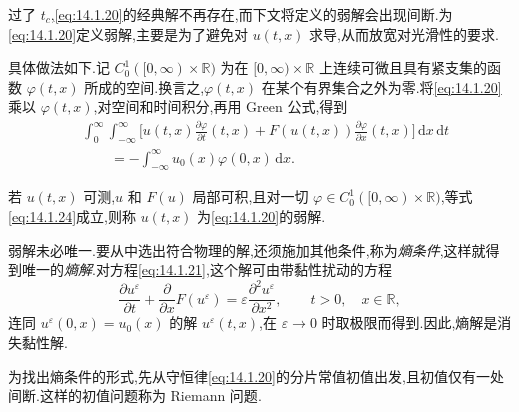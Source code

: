 过了 \(t_c\),\eqref{eq:14.1.20}的经典解不再存在,而下文将定义的弱解会出现间断.为\eqref{eq:14.1.20}定义弱解,主要是为了避免对 \(u(t,x)\) 求导,从而放宽对光滑性的要求.

具体做法如下.记 \(C_0^1([0,\infty)\times\mathbb R)\) 为在 \([0,\infty)\times\mathbb R\) 上连续可微且具有紧支集的函数 \(\varphi(t,x)\) 所成的空间.换言之,\(\varphi(t,x)\) 在某个有界集合之外为零.将\eqref{eq:14.1.20}乘以 \(\varphi(t,x)\),对空间和时间积分,再用 Green 公式,得到
\begin{equation}\label{eq:14.1.24}
  \begin{aligned}
    &\int_0^\infty\!\!\int_{-\infty}^\infty
         \biggl[u(t,x)\frac{\partial\varphi}{\partial t}(t,x)
                +F(u(t,x))\frac{\partial\varphi}{\partial x}(t,x)\biggr]
                   \,\mathrm dx\,\mathrm dt\\
    &\qquad=-\int_{-\infty}^{\infty}u_0(x)\varphi(0,x)\,\mathrm dx.
  \end{aligned}
\end{equation}

\begin{definition*}
若 \(u(t,x)\) 可测,\(u\) 和 \(F(u)\) 局部可积,且对一切 \(\varphi\in C_0^1([0,\infty)\times\mathbb R)\),等式\eqref{eq:14.1.24}成立,则称 \(u(t,x)\) 为\eqref{eq:14.1.20}的{\heiti 弱解}.
\end{definition*}

弱解未必唯一.要从中选出符合物理的解,还须施加其他条件,称为\emph{熵条件},这样就得到唯一的\emph{熵解}.对方程\eqref{eq:14.1.21},这个解可由带黏性扰动的方程
\begin{equation}\label{eq:14.1.25}
  \frac{\partial u^\varepsilon}{\partial t}
    +\frac{\partial}{\partial x}F(u^\varepsilon)
    =\varepsilon\frac{\partial^2u^\varepsilon}{\partial x^2},
    \qquad t>0,\quad x\in\mathbb R,
\end{equation}
连同 \(u^\varepsilon(0,x)=u_0(x)\) 的解 \(u^\varepsilon(t,x)\),在 \(\varepsilon\to0\) 时取极限而得到.因此,熵解是消失黏性解.

\begin{definition*}
为找出熵条件的形式,先从守恒律\eqref{eq:14.1.20}的分片常值初值出发,且初值仅有一处间断.这样的初值问题称为 {\heiti Riemann 问题}.
\end{definition*}

